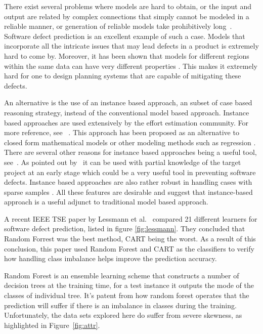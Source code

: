 \documentclass[12pt]{IEEEtran}
\begin{document}
There exist several problems where models are hard to obtain, or the input and output are related by complex connections that simply cannot be modeled in a reliable manner, or generation of reliable models take prohibitively long~\cite{Ludewig2003}. Software defect prediction is an excellent example of such a case. Models that incorporate all the intricate issues that may lead defects in a product is extremely hard to come by. Moreover, it has been shown that models for different regions within the same data can have very different properties \cite{localvsglobal}. This makes it extremely hard for one to design planning systems that are capable of mitigating these defects.

An alternative is the use of an instance based approach, an subset of case based reasoning strategy, instead of the conventional model based approach. Instance based approaches are used extensively by the effort estimation community. For more reference, see ~\cite{keung2008analogy, 6600685, walkerden1999empirical, shepperd1997estimating, kocaguneli2010use}. This approach has been proposed as an alternative to closed form mathematical models or other modeling methods such as regression \cite{keung2008analogy}. There are several other reasons for instance based approaches being a useful tool, see~\cite{6600685}. As pointed out by~\cite{walkerden1999empirical} it can be used with partial knowledge of the target project at an early stage which could be a very useful tool in preventing software defects. Instance based approaches are also rather robust in handling cases with sparse samples \cite{1438374}. All these features are desirable and suggest that instance-based approach is a useful adjunct to traditional model based approach. 
 
A recent IEEE TSE paper by Lessmann et al.~\cite{lessmann} compared 21 different learners for software defect prediction, listed in figure \ref{fig:lessmann}. They concluded that Random Forrest was the best method, CART being the worst. As a result of this conclusion, this paper used Random Forest and CART as the classifiers to verify how handling class imbalance helps improve the prediction accuracy.

Random Forest is an ensemble learning scheme that constructs a number of decision trees at the training time, for a test instance it outputs the mode of the classes of individual tree. It's patent from how random forest operates that the prediction will suffer if there is an imbalance in classes during the training. Unfortunately, the data sets explored here do suffer from severe skewness, as highlighted in Figure~\ref{fig:attr}. 
\end{document}
